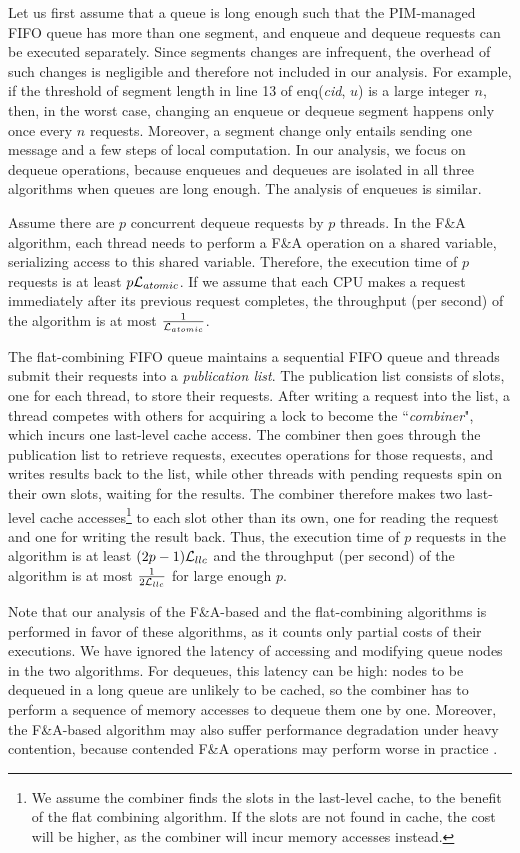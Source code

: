 Let us first assume that a queue is long enough such that the PIM-managed FIFO queue 
has more than one segment, and enqueue and dequeue requests can be executed separately. 
Since segments changes are infrequent, 
the overhead of such changes is negligible and therefore not included in our analysis.
For example, if the threshold of segment length in line 13 of enq(\textit{cid}, $u$) is a large integer $n$, 
then, in the worst case, changing an enqueue or dequeue segment happens only once every $n$ requests.
Moreover, a segment change only entails sending one message and a few steps of local computation.
In our analysis, we focus on dequeue operations, because 
 enqueues and dequeues are isolated in all three algorithms when queues are long enough.
 The analysis of enqueues is similar. 

Assume there are $p$ concurrent dequeue requests by $p$ threads. 
In the F\&A algorithm, each thread needs to perform a F\&A operation on a shared variable, 
serializing access to this shared variable. 
Therefore, 
the execution time of $p$ requests is at least $p\mathcal{L}_{atomic}$. 
If we assume that each CPU makes a request immediately after its previous request completes, 
the throughput (per second) of the algorithm is at most ${1 \over \mathcal{L}_{atomic}}$. 

The flat-combining FIFO queue maintains a sequential FIFO queue and 
threads submit their requests into a \emph{publication list}. 
The publication list consists of slots, one for each thread, to store their requests.
After writing a request into the list, a thread competes with others for acquiring a lock 
to become the ``\emph{combiner}", which incurs one last-level cache access. 
The combiner then goes through the publication list to retrieve requests, executes operations for those requests, 
and writes results back to the list, while other threads with pending requests spin on their own slots, 
waiting for the results. 
The combiner therefore makes two last-level cache accesses\footnote{We assume the combiner finds the slots 
in the last-level cache, to the benefit of the flat combining algorithm. If the slots are not found in cache, 
the cost will be higher, as the combiner will incur memory accesses instead.} to each slot other than its own, 
one for reading the request and one for writing the result back. 
Thus, the execution time of $p$ requests in the algorithm is at least $(2p-1)\mathcal{L}_{llc}$ and 
the throughput (per second) of the algorithm is at most ${1 \over 2\mathcal{L}_{llc}}$ for large enough $p$.

Note that our analysis of the F\&A-based and the flat-combining algorithms is performed in favor of these 
algorithms, 
as it counts only partial costs of their executions. 
We have ignored the latency of accessing and modifying queue nodes in the two algorithms. 
For dequeues, this latency can be high: nodes to be dequeued in a long queue are unlikely 
to be cached, so the combiner has to perform a sequence of memory accesses to dequeue them one by one.  
Moreover, the F\&A-based algorithm may also suffer performance degradation under heavy contention, 
because contended F\&A operations may perform worse in practice \cite{David13}.

